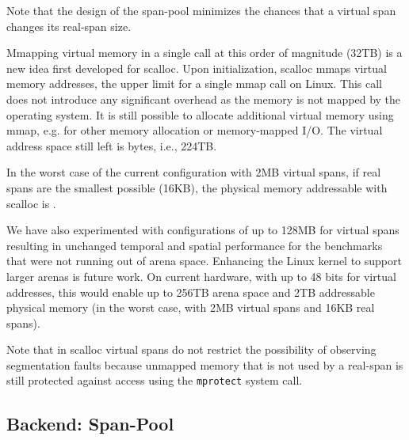 \documentclass[10pt]{sigplanconf}
\newcommand{\impl}[1]{{\tt #1}\xspace}
\begin{document}
Note that the design of the span-pool minimizes the chances
that a virtual span changes its real-span size.

Mmapping virtual memory in a single call at this order of
magnitude (32TB) is a new idea first developed for scalloc. Upon initialization,
scalloc mmaps  virtual memory addresses, the upper limit for a single
mmap call on Linux. This call does not introduce any significant overhead as the
memory is not mapped by the operating system. It is still possible to allocate
additional virtual memory using mmap, e.g. for other memory allocation or
memory-mapped I/O.  The virtual address space still left is 
bytes, i.e., 224TB.

In the worst case of the current configuration with 2MB virtual spans, if real
spans are the smallest possible (16KB), the physical memory addressable with
scalloc is
.

We have also experimented with configurations of up to 128MB for virtual spans
resulting in unchanged temporal and spatial performance for the benchmarks that
were not running out of arena space. Enhancing the Linux kernel to support
larger arenas is future work. On current hardware, with up to 48 bits for
virtual addresses, this would enable up to 256TB arena space and 2TB addressable
physical memory (in the worst case, with 2MB virtual spans and 16KB real spans).

Note that in scalloc virtual spans do not restrict the possibility of observing
segmentation faults because unmapped memory that is not used by a real-span is
still protected against access using the \impl{mprotect} system call.

\subsection{Backend: Span-Pool}
\end{document}
